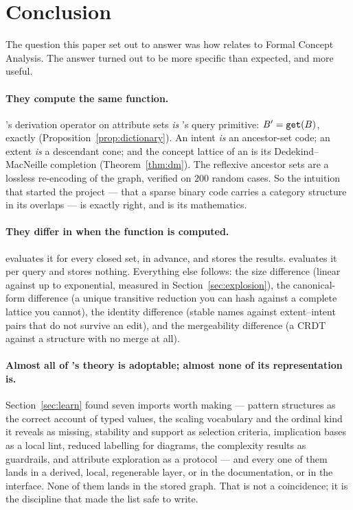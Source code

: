 \section{Conclusion}
\label{sec:conclusion}

The question this paper set out to answer was how \odag{} relates to Formal
Concept Analysis. The answer turned out to be more specific than expected, and
more useful.

\paragraph{They compute the same function.} \fca{}'s derivation operator on
attribute sets \emph{is} \odag{}'s query primitive:
$B' = \texttt{get}(B)$, exactly (Proposition~\ref{prop:dictionary}). An \fca{}
intent \emph{is} an ancestor-set code; an extent \emph{is} a descendant cone;
and the concept lattice of an \odag{} is its Dedekind--MacNeille completion
(Theorem~\ref{thm:dm}). The reflexive ancestor sets are a lossless re-encoding
of the graph, verified on 200 random cases. So the intuition that started the
project --- that a sparse binary code carries a category structure in its
overlaps --- is exactly right, and \fca{} is its mathematics.

\paragraph{They differ in when the function is computed.} \fca{} evaluates it
for every closed set, in advance, and stores the results. \odag{} evaluates it
per query and stores nothing. Everything else follows: the size difference
(linear against up to exponential, measured in Section~\ref{sec:explosion}),
the canonical-form difference (a unique transitive reduction you can hash
against a complete lattice you cannot), the identity difference (stable names
against extent--intent pairs that do not survive an edit), and the
mergeability difference (a CRDT against a structure with no merge at all).

\paragraph{Almost all of \fca{}'s theory is adoptable; almost none of its
representation is.} Section~\ref{sec:learn} found seven imports worth making
--- pattern structures as the correct account of typed values, the scaling
vocabulary and the ordinal kind it reveals as missing, stability and support
as selection criteria, implication bases as a local lint, reduced labelling
for diagrams, the complexity results as guardrails, and attribute exploration
as a protocol --- and every one of them lands in a derived, local, regenerable
layer, or in the documentation, or in the interface. None of them lands in the
stored graph. That is not a coincidence; it is the discipline that made the
list safe to write.

